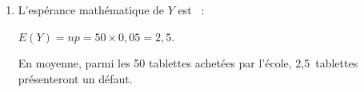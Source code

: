 \begin{corrige}
\begin{enumerate}
{          }
          \par
          \item %
          L'espérance mathématique de $Y$ est ~:
          \par
          $E(Y)=np=50 \times 0,05=2,5$.
          \par
          En moyenne, parmi les 50 tablettes achetées par l'école, 2,5~tablettes présenteront un défaut.
          \par
          \par
     \end{enumerate}
\end{corrige}
